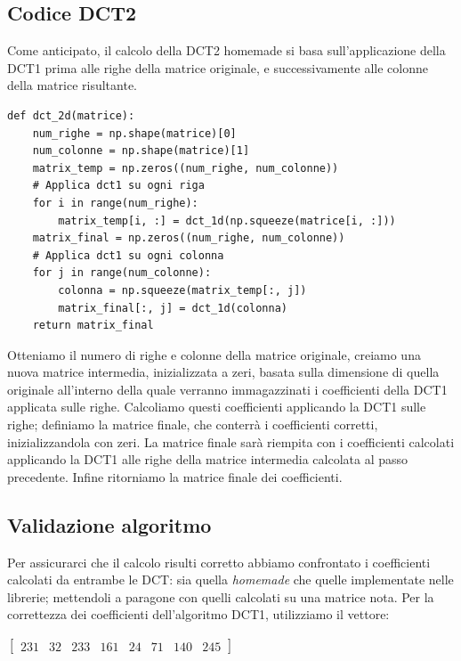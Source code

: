 \subsection{Codice DCT2}
Come anticipato, il calcolo della DCT2 homemade si basa sull'applicazione della DCT1 prima alle righe della matrice originale, e successivamente alle colonne della matrice risultante.
\begin{listing}[ht]
\begin{verbatim}
def dct_2d(matrice):
	num_righe = np.shape(matrice)[0]
	num_colonne = np.shape(matrice)[1]
	matrix_temp = np.zeros((num_righe, num_colonne))
	# Applica dct1 su ogni riga
	for i in range(num_righe):
		matrix_temp[i, :] = dct_1d(np.squeeze(matrice[i, :]))
	matrix_final = np.zeros((num_righe, num_colonne))
	# Applica dct1 su ogni colonna
	for j in range(num_colonne):
		colonna = np.squeeze(matrix_temp[:, j])
		matrix_final[:, j] = dct_1d(colonna)
	return matrix_final
\end{verbatim}
\end{listing}

Otteniamo il numero di righe e colonne della matrice originale, creiamo una nuova matrice intermedia, inizializzata a zeri, basata sulla dimensione di quella originale all'interno della quale verranno immagazzinati i coefficienti della DCT1 applicata sulle righe.
Calcoliamo questi coefficienti applicando la DCT1 sulle righe; definiamo la matrice finale, che conterrà i coefficienti corretti, inizializzandola con zeri.
La matrice finale sarà riempita con i coefficienti calcolati applicando la DCT1 alle righe della matrice intermedia calcolata al passo precedente.
Infine ritorniamo la matrice finale dei coefficienti.

\subsection{Validazione algoritmo}
Per assicurarci che il calcolo risulti corretto abbiamo confrontato i coefficienti calcolati da entrambe le DCT: sia quella \textit{homemade} che quelle implementate nelle librerie; mettendoli a paragone con quelli calcolati su una matrice nota.
Per la correttezza dei coefficienti dell'algoritmo DCT1, utilizziamo il vettore:
\begin{center}
	$
	\begin{bmatrix}
		231 & 32 & 233 & 161 & 24 & 71 & 140 & 245
	\end{bmatrix}
	$
\end{center}

